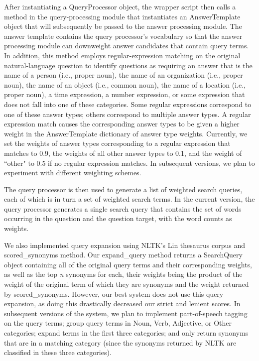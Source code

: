 \documentclass[11pt]{article}
\begin{document}
After instantiating a QueryProcessor object, the wrapper script then calls a method in the query-processing module that instantiates an AnswerTemplate object that will subsequently be passed to the answer processing module. The answer template contains the query processor's vocabulary so that the answer processing module can downweight answer candidates that contain query terms. In addition, this method employs regular-expression matching on the original natural-language question to identify questions as requiring an answer that is the name of a person (i.e., proper noun), the name of an organization (i.e., proper noun), the name of an object (i.e., common noun), the name of a location (i.e., proper noun), a time expression, a number expression, or some expression that does not fall into one of these categories. Some regular expressions correspond to one of these answer types; others correspond to multiple answer types. A regular expression match causes the corresponding answer types to be given a higher weight in the AnswerTemplate dictionary of answer type weights. Currently, we set the weights of answer types corresponding to a regular expression that matches to 0.9, the weights of all other answer types to 0.1, and the weight of ``other" to 0.5 if no regular expression matches. In subsequent versions, we plan to experiment with different weighting schemes.

The query processor is then used to generate a list of weighted search queries, each of which is in turn a set of weighted search terms. In the current version, the query processor generates a single search query that contains the set of words occurring in the question and the question target, with the word counts as weights.

We also implemented query expansion using NLTK's Lin thesaurus corpus and scored\_synonyms method. Our expand\_query method returns a SearchQuery object containing all of the original query terms and their corresponding weights, as well as the top \emph{n} synonyms for each, their weights being the product of the weight of the original term of which they are synonyms and the weight returned by scored\_synonyms. However, our best system does not use this query expansion, as doing this drastically decreased our strict and lenient scores. In subsequent versions of the system, we plan to implement part-of-speech tagging on the query terms; group query terms in Noun, Verb, Adjective, or Other categories; expand terms in the first three categories; and only return synonyms that are in a matching category (since the synonyms returned by NLTK are classified in these three categories).
\end{document}
